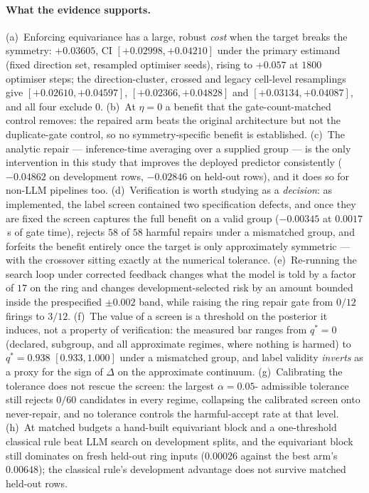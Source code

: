 \documentclass{neurips_2024}
\begin{document}
\paragraph{What the evidence supports.}
(a)~Enforcing equivariance has a large, robust \emph{cost} when the target breaks the
symmetry: $+0.03605$, CI $[+0.02998,+0.04210]$ under the primary estimand (fixed direction
set, resampled optimiser seeds), rising to $+0.057$ at $1800$ optimiser steps; the
direction-cluster, crossed and legacy cell-level resamplings give
$[+0.02610,+0.04597]$, $[+0.02366,+0.04828]$ and $[+0.03134,+0.04087]$, and all four exclude
$0$. (b)~At $\eta{=}0$ a benefit that the gate-count-matched control removes: the repaired arm
beats the original architecture but not the duplicate-gate control, so no symmetry-specific
benefit is established. (c)~The analytic repair --- inference-time averaging over a supplied
group --- is the only intervention in this study that improves the deployed predictor
consistently ($-0.04862$ on development rows, $-0.02846$ on held-out rows), and it does so for
non-LLM pipelines too. (d)~Verification is worth studying as a \emph{decision}: as
implemented, the label screen contained two specification defects, and once they are fixed the
screen captures the full benefit on a valid group ($-0.00345$ at $0.0017$\,s of gate time),
rejects $58$ of $58$ harmful repairs under a mismatched group, and forfeits the benefit
entirely once the target is only approximately symmetric --- with the crossover sitting exactly
at the numerical tolerance. (e)~Re-running the search loop under corrected feedback changes what
the model is told by a factor of $17$ on the ring and changes development-selected risk by an
amount bounded inside the prespecified $\pm0.002$ band, while raising the ring repair gate from
$0/12$ firings to $3/12$. (f)~The value of a screen is a threshold on the posterior it induces, not
a property of verification: the measured bar ranges from $q^* = 0$ (declared, subgroup, and all
approximate regimes, where nothing is harmed) to $q^* = 0.938$ $[0.933, 1.000]$ under a mismatched
group, and label validity \emph{inverts} as a proxy for the sign of $\Delta$ on the approximate
continuum. (g)~Calibrating the tolerance does not rescue the screen: the largest $\alpha{=}0.05$-
admissible tolerance still rejects $0/60$ candidates in every regime, collapsing the calibrated
screen onto never-repair, and no tolerance controls the harmful-accept rate at that level. (h)~At
matched budgets a hand-built equivariant block and a
one-threshold classical rule beat LLM search on development splits, and the equivariant block
still dominates on fresh held-out ring inputs ($0.00026$ against the best arm's $0.00648$);
the classical rule's development advantage does not survive matched held-out rows.
\end{document}
